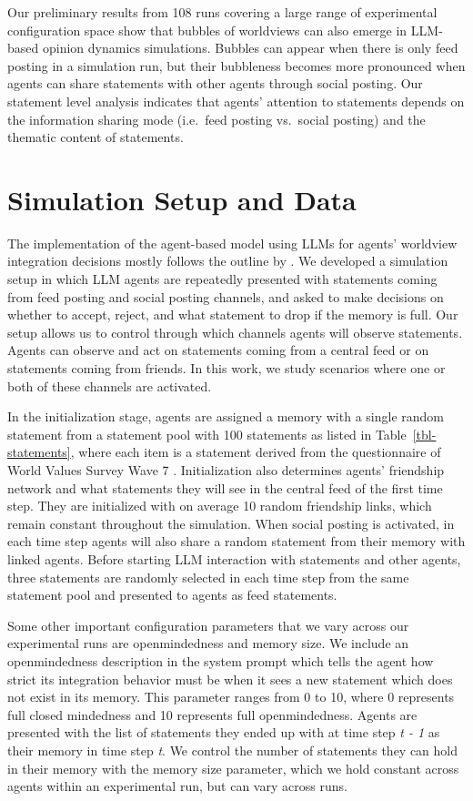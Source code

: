 \documentclass[]{ceurart}
\begin{document}
Our preliminary results from 108 runs covering a large range of
experimental configuration space show that bubbles of worldviews can
also emerge in LLM-based opinion dynamics simulations. Bubbles can
appear when there is only feed posting in a simulation run, but their
bubbleness becomes more pronounced when agents can share statements with
other agents through social posting. Our statement level analysis
indicates that agents' attention to statements depends on the
information sharing mode (i.e.~feed posting vs.~social posting) and the
thematic content of statements.

\section{Simulation Setup and Data}\label{simulation-setup-and-data}

The implementation of the agent-based model using LLMs for agents'
worldview integration decisions mostly follows the outline by
\citet{LorenzGunes2025FilterBubblesAgentbased}. We developed a
simulation setup in which LLM agents are repeatedly presented with
statements coming from feed posting and social posting channels, and
asked to make decisions on whether to accept, reject, and what statement
to drop if the memory is full. Our setup allows us to control through
which channels agents will observe statements. Agents can observe and
act on statements coming from a central feed or on statements coming
from friends. In this work, we study scenarios where one or both of
these channels are activated.

In the initialization stage, agents are assigned a memory with a single
random statement from a statement pool with 100 statements as listed in
Table~\ref{tbl-statements}, where each item is a statement derived from
the questionnaire of World Values Survey Wave 7
\citep{HaerpferEtAl2022WorldValuesSurvey}. Initialization also
determines agents' friendship network and what statements they will see
in the central feed of the first time step. They are initialized with on
average 10 random friendship links, which remain constant throughout the
simulation. When social posting is activated, in each time step agents
will also share a random statement from their memory with linked agents.
Before starting LLM interaction with statements and other agents, three
statements are randomly selected in each time step from the same
statement pool and presented to agents as feed statements.

Some other important configuration parameters that we vary across our
experimental runs are openmindedness and memory size. We include an
openmindedness description in the system prompt which tells the agent
how strict its integration behavior must be when it sees a new statement
which does not exist in its memory. This parameter ranges from 0 to 10,
where 0 represents full closed mindedness and 10 represents full
openmindedness. Agents are presented with the list of statements they
ended up with at time step \emph{t - 1} as their memory in time step
\emph{t}. We control the number of statements they can hold in their
memory with the memory size parameter, which we hold constant across
agents within an experimental run, but can vary across runs.
\end{document}
